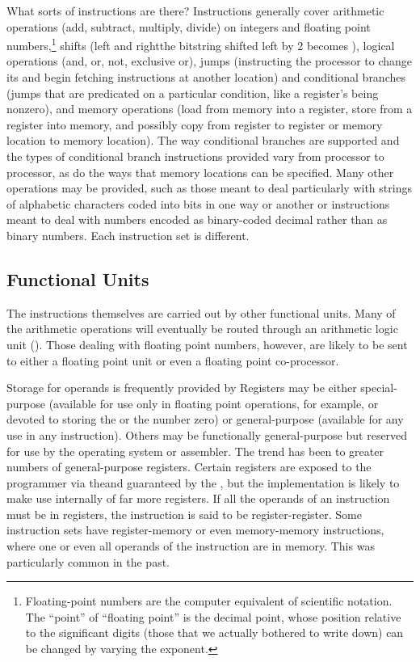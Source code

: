 What sorts of instructions are there? Instructions generally cover arithmetic operations (add, subtract, multiply, divide) on integers and floating point numbers,\footnote{Floating-point numbers are the computer equivalent of scientific notation. The ``point'' of ``floating point'' is the decimal point, whose position relative to the significant digits (those that we actually bothered to write down) can be changed by varying the exponent.} shifts (left and right\empause the bitstring  shifted left by 2 becomes ), logical operations (and, or, not, exclusive or),  jumps (instructing the processor to change its  and begin fetching instructions at another location) and conditional branches (jumps that are predicated on a particular condition, like a register's being nonzero), and memory operations (load from memory into a register, store from a register into memory, and possibly copy from register to register or memory location to memory location). The way conditional branches are supported and the types of conditional branch instructions provided vary from processor to processor, as do the ways that memory locations can be specified. Many other operations may be provided, such as those meant to deal particularly with strings of alphabetic characters coded into bits in one way or another or instructions meant to deal with numbers encoded as binary-coded decimal rather than as binary numbers. Each instruction set is different.

\subsection{Functional Units}
The instructions themselves are carried out by other functional units. Many of the arithmetic operations will eventually be routed through an arithmetic logic unit (). Those dealing with floating point numbers, however, are likely to be sent to either a floating point unit or even a floating point co-processor.

Storage for operands is frequently provided by  Registers may be either special-purpose (available for use only in floating point operations, for example, or devoted to storing the  or the number zero) or general-purpose (available for any use in any instruction). Others may be functionally general-purpose but reserved for use by the operating system or assembler. The trend has been to greater numbers of general-purpose registers. Certain registers are exposed to the programmer via the\ISL and guaranteed by the \ISA{}, but the implementation is likely to make use internally of far more registers. If all the operands of an instruction must be in registers, the instruction is said to be register-register. Some instruction sets have register-memory or even memory-memory instructions, where one or even all operands of the instruction are in memory. This was particularly common in the past.

